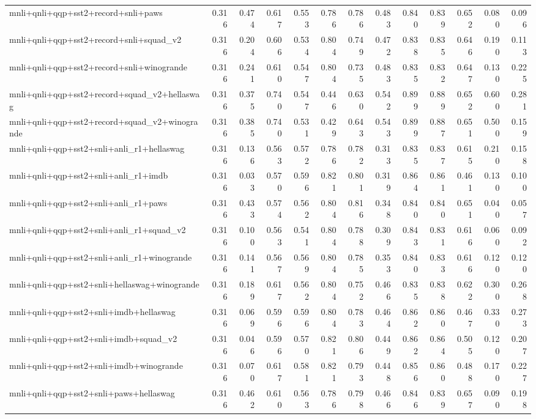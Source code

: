 \begin{table}[t]
\begin{tabular}{lrrrrrrrrrrrr}
    mnli+qnli+qqp+sst2+record+snli+paws & 0.316 & 0.474 & 0.617 & 0.553 & 0.786 & 0.786 & 0.483 & 0.840 & 0.839 & 0.652 & 0.080 & 0.096 \\
    mnli+qnli+qqp+sst2+record+snli+squad\_v2 & 0.316 & 0.204 & 0.606 & 0.534 & 0.804 & 0.749 & 0.472 & 0.838 & 0.835 & 0.646 & 0.190 & 0.113 \\
    mnli+qnli+qqp+sst2+record+snli+winogrande & 0.316 & 0.241 & 0.610 & 0.547 & 0.804 & 0.735 & 0.483 & 0.835 & 0.832 & 0.647 & 0.130 & 0.225 \\
    mnli+qnli+qqp+sst2+record+squad\_v2+hellaswag & 0.316 & 0.375 & 0.740 & 0.547 & 0.446 & 0.630 & 0.542 & 0.899 & 0.889 & 0.652 & 0.600 & 0.281 \\
    mnli+qnli+qqp+sst2+record+squad\_v2+winogrande & 0.316 & 0.385 & 0.740 & 0.531 & 0.429 & 0.643 & 0.543 & 0.899 & 0.887 & 0.651 & 0.500 & 0.159 \\
    mnli+qnli+qqp+sst2+snli+anli\_r1+hellaswag & 0.316 & 0.136 & 0.563 & 0.572 & 0.786 & 0.782 & 0.313 & 0.835 & 0.837 & 0.615 & 0.210 & 0.158 \\
    mnli+qnli+qqp+sst2+snli+anli\_r1+imdb & 0.316 & 0.033 & 0.570 & 0.596 & 0.821 & 0.801 & 0.319 & 0.864 & 0.861 & 0.461 & 0.130 & 0.100 \\
    mnli+qnli+qqp+sst2+snli+anli\_r1+paws & 0.316 & 0.433 & 0.574 & 0.562 & 0.804 & 0.816 & 0.348 & 0.840 & 0.840 & 0.651 & 0.040 & 0.057 \\
    mnli+qnli+qqp+sst2+snli+anli\_r1+squad\_v2 & 0.316 & 0.100 & 0.563 & 0.541 & 0.804 & 0.788 & 0.309 & 0.843 & 0.831 & 0.616 & 0.060 & 0.092 \\
    mnli+qnli+qqp+sst2+snli+anli\_r1+winogrande & 0.316 & 0.141 & 0.567 & 0.569 & 0.804 & 0.785 & 0.353 & 0.840 & 0.833 & 0.616 & 0.120 & 0.120 \\
    mnli+qnli+qqp+sst2+snli+hellaswag+winogrande & 0.316 & 0.189 & 0.617 & 0.562 & 0.804 & 0.752 & 0.466 & 0.835 & 0.838 & 0.622 & 0.300 & 0.268 \\
    mnli+qnli+qqp+sst2+snli+imdb+hellaswag & 0.316 & 0.069 & 0.596 & 0.596 & 0.804 & 0.783 & 0.464 & 0.862 & 0.860 & 0.467 & 0.330 & 0.273 \\
    mnli+qnli+qqp+sst2+snli+imdb+squad\_v2 & 0.316 & 0.046 & 0.596 & 0.570 & 0.821 & 0.806 & 0.449 & 0.862 & 0.864 & 0.505 & 0.120 & 0.207 \\
    mnli+qnli+qqp+sst2+snli+imdb+winogrande & 0.316 & 0.070 & 0.617 & 0.581 & 0.821 & 0.793 & 0.448 & 0.856 & 0.860 & 0.488 & 0.170 & 0.227 \\
    mnli+qnli+qqp+sst2+snli+paws+hellaswag & 0.316 & 0.462 & 0.610 & 0.563 & 0.786 & 0.798 & 0.466 & 0.846 & 0.839 & 0.657 & 0.090 & 0.198 \\

\end{tabular}
\end{table}
